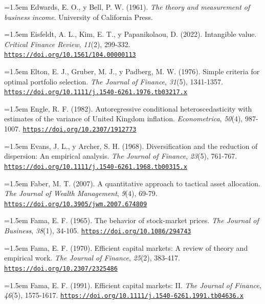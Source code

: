 \documentclass[10pt,a4paper]{article}
\begin{document}
\noindent\hangindent=1.5em Edwards, E. O., y Bell, P. W. (1961). \textit{The theory and measurement of business income}. University of California Press.

\noindent\hangindent=1.5em Eisfeldt, A. L., Kim, E. T., y Papanikolaou, D. (2022). Intangible value. \textit{Critical Finance Review}, \textit{11}(2), 299-332. \href{https://doi.org/10.1561/104.00000113}{\nolinkurl{https://doi.org/10.1561/104.00000113}}

\noindent\hangindent=1.5em Elton, E. J., Gruber, M. J., y Padberg, M. W. (1976). Simple criteria for optimal portfolio selection. \textit{The Journal of Finance}, \textit{31}(5), 1341-1357. \href{https://doi.org/10.1111/j.1540-6261.1976.tb03217.x}{\nolinkurl{https://doi.org/10.1111/j.1540-6261.1976.tb03217.x}}

\noindent\hangindent=1.5em Engle, R. F. (1982). Autoregressive conditional heteroscedasticity with estimates of the variance of United Kingdom inflation. \textit{Econometrica}, \textit{50}(4), 987-1007. \href{https://doi.org/10.2307/1912773}{\nolinkurl{https://doi.org/10.2307/1912773}}

\noindent\hangindent=1.5em Evans, J. L., y Archer, S. H. (1968). Diversification and the reduction of dispersion: An empirical analysis. \textit{The Journal of Finance}, \textit{23}(5), 761-767. \href{https://doi.org/10.1111/j.1540-6261.1968.tb00315.x}{\nolinkurl{https://doi.org/10.1111/j.1540-6261.1968.tb00315.x}}

\noindent\hangindent=1.5em Faber, M. T. (2007). A quantitative approach to tactical asset allocation. \textit{The Journal of Wealth Management}, \textit{9}(4), 69-79. \href{https://doi.org/10.3905/jwm.2007.674809}{\nolinkurl{https://doi.org/10.3905/jwm.2007.674809}}

\noindent\hangindent=1.5em Fama, E. F. (1965). The behavior of stock-market prices. \textit{The Journal of Business}, \textit{38}(1), 34-105. \href{https://doi.org/10.1086/294743}{\nolinkurl{https://doi.org/10.1086/294743}}

\noindent\hangindent=1.5em Fama, E. F. (1970). Efficient capital markets: A review of theory and empirical work. \textit{The Journal of Finance}, \textit{25}(2), 383-417. \href{https://doi.org/10.2307/2325486}{\nolinkurl{https://doi.org/10.2307/2325486}}

\noindent\hangindent=1.5em Fama, E. F. (1991). Efficient capital markets: II. \textit{The Journal of Finance}, \textit{46}(5), 1575-1617. \href{https://doi.org/10.1111/j.1540-6261.1991.tb04636.x}{\nolinkurl{https://doi.org/10.1111/j.1540-6261.1991.tb04636.x}}
\end{document}
